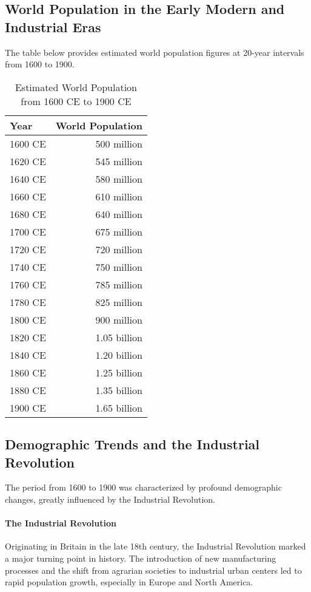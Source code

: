 \documentclass[a4paper,12pt]{book}
\begin{document}
\subsection*{World Population in the Early Modern and Industrial Eras}
The table below provides estimated world population figures at 20-year intervals from 1600 to 1900.

\begin{table}[h!]
\centering
\begin{tabular}{|l|r|}
\hline
Year & World Population \\
\hline
1600 CE & 500 million \\
1620 CE & 545 million \\
1640 CE & 580 million \\
1660 CE & 610 million \\
1680 CE & 640 million \\
1700 CE & 675 million \\
1720 CE & 720 million \\
1740 CE & 750 million \\
1760 CE & 785 million \\
1780 CE & 825 million \\
1800 CE & 900 million \\
1820 CE & 1.05 billion \\
1840 CE & 1.20 billion \\
1860 CE & 1.25 billion \\
1880 CE & 1.35 billion \\
1900 CE & 1.65 billion \\
\hline
\end{tabular}
\caption{Estimated World Population from 1600 CE to 1900 CE}
\label{tab:world_population_1600_1900}
\end{table}

\subsection*{Demographic Trends and the Industrial Revolution}
The period from 1600 to 1900 was characterized by profound demographic changes, greatly influenced by the Industrial Revolution.

\paragraph{The Industrial Revolution}
Originating in Britain in the late 18th century, the Industrial Revolution marked a major turning point in history. The introduction of new manufacturing processes and the shift from agrarian societies to industrial urban centers led to rapid population growth, especially in Europe and North America.
\end{document}

